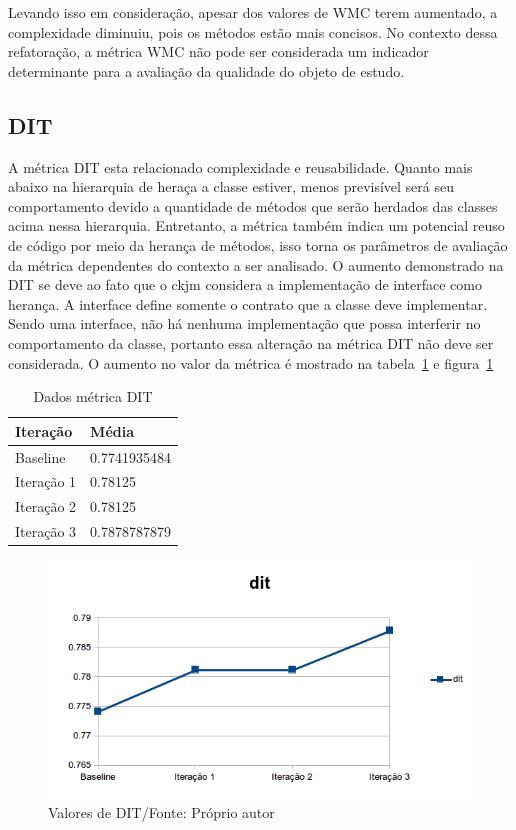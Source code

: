 Levando isso em consideração, apesar dos valores de WMC
terem aumentado, a complexidade diminuiu, pois os métodos estão mais concisos.
No contexto dessa refatoração, a métrica WMC não pode ser considerada um
indicador determinante para a avaliação da qualidade do objeto de estudo.


\subsection{DIT}

A métrica DIT esta relacionado complexidade e reusabilidade. Quanto mais abaixo
na hierarquia de heraça a classe estiver, menos previsível será seu
comportamento devido a quantidade de métodos que serão herdados das classes
acima nessa hierarquia. Entretanto, a métrica também indica um potencial reuso
de código por meio da herança de métodos, isso torna os parâmetros de avaliação
da métrica dependentes do contexto a ser analisado. O aumento demonstrado na DIT
se deve ao fato que o ckjm considera a implementação de interface como herança.
A interface define somente o contrato que a classe deve implementar. Sendo uma
interface, não há nenhuma implementação que possa interferir no comportamento
da classe, portanto essa alteração na métrica DIT não deve ser considerada. O
aumento no valor da métrica é mostrado na tabela~\ref{tab:dit} e
figura~\ref{fig:dit}

\begin{table}[!h]
	\centering
	    \caption{Dados métrica DIT}
    \begin{tabular}{ | l | l | }
    \hline
    Iteração & Média 			\\ \hline
    Baseline & 0.7741935484  	\\ \hline
    Iteração 1 & 0.78125		\\ \hline
	Iteração 2 & 0.78125			\\ \hline
	Iteração 3 & 0.7878787879	\\ \hline
    \end{tabular}
    \label{tab:dit}
\end{table}

\begin{figure}[!h]
	\centering
	\includegraphics{img/dit.png}
	\caption{Valores de DIT/Fonte: Próprio autor}
	\label{fig:dit}
\end{figure}


